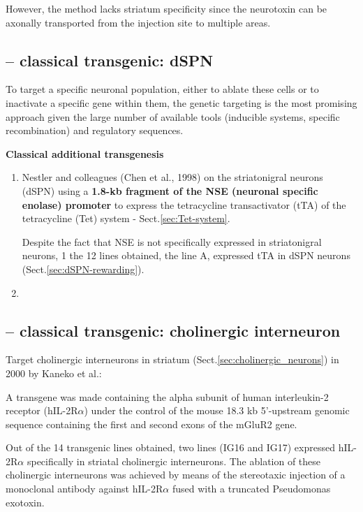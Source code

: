 However, the method lacks striatum specificity since the neurotoxin can be
axonally transported from the injection site to multiple areas.
  
\subsection{-- classical transgenic: dSPN}

To target a specific neuronal population, either to ablate these cells or to
inactivate a specific gene within them, the genetic targeting is the most
promising approach given the large number of available tools (inducible systems,
specific recombination) and regulatory sequences.   

{\bf Classical additional transgenesis}
\begin{enumerate}
  
  \item  Nestler and colleagues (Chen et al., 1998) on the striatonigral neurons
  (dSPN) using a {\bf 1.8-kb fragment of the NSE (neuronal specific enolase)
  promoter} to express the tetracycline transactivator (tTA) of the tetracycline (Tet)
  system - Sect.\ref{sec:Tet-system}.

\label{sec:NSE}
  Despite the fact that NSE is not specifically expressed in striatonigral
  neurons, 1 the 12 lines obtained, the line A, expressed tTA in dSPN neurons
  (Sect.\ref{sec:dSPN-rewarding}).
  
  
  \item 
\end{enumerate}

\subsection{-- classical transgenic: cholinergic interneuron}

Target cholinergic interneurons in striatum 
(Sect.\ref{sec:cholinergic_neurons}) in 2000 by Kaneko et al.:

A transgene was made containing the alpha subunit of human interleukin-2
receptor (hIL-2R$\alpha$) under the control of the mouse 18.3 kb 5'-upstream
genomic sequence containing the first and second exons of the mGluR2 gene.

Out of the 14 transgenic lines obtained, two lines (IG16 and IG17) expressed
hIL-2R$\alpha$ specifically in striatal cholinergic interneurons.
The ablation of these cholinergic interneurons was achieved by means of the
stereotaxic injection of a monoclonal antibody against hIL-2R$\alpha$ fused with
a truncated Pseudomonas exotoxin.


